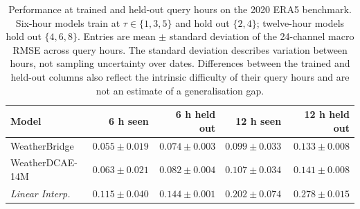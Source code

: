 \begin{table}[t]
\centering
\caption{Performance at trained and held-out query hours on the 2020 ERA5 benchmark. Six-hour models train at $\tau\in\{1,3,5\}$ and hold out $\{2,4\}$; twelve-hour models hold out $\{4,6,8\}$. Entries are mean $\pm$ standard deviation of the 24-channel macro RMSE across query hours. The standard deviation describes variation between hours, not sampling uncertainty over dates. Differences between the trained and held-out columns also reflect the intrinsic difficulty of their query hours and are not an estimate of a generalisation gap.}
\label{tab:query-generalization}
\small
\setlength{\tabcolsep}{3.5pt}
\begin{tabular}{lrrrr}
\toprule
Model & 6 h seen & 6 h held out & 12 h seen & 12 h held out \\
\midrule
WeatherBridge & $\mathbf{0.055\pm0.019}$ & $\mathbf{0.074\pm0.003}$ & $\mathbf{0.099\pm0.033}$ & $\mathbf{0.133\pm0.008}$ \\
WeatherDCAE-14M & \underline{$0.063\pm0.021$} & \underline{$0.082\pm0.004$} & \underline{$0.107\pm0.034$} & \underline{$0.141\pm0.008$} \\
\midrule
\textit{Linear Interp.} & $0.115\pm0.040$ & $0.144\pm0.001$ & $0.202\pm0.074$ & $0.278\pm0.015$ \\
\bottomrule
\end{tabular}
\end{table}
